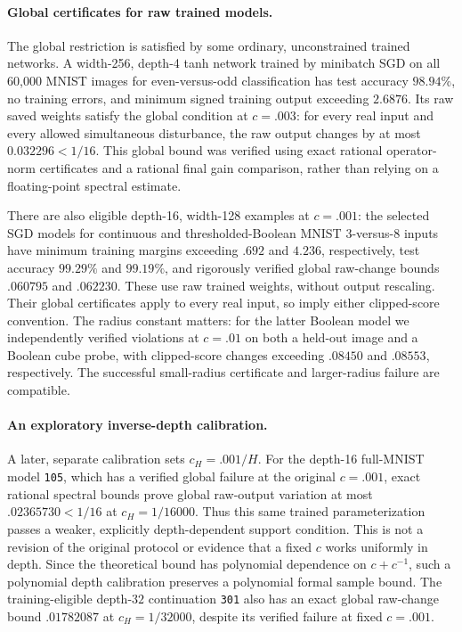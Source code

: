 \paragraph{Global certificates for raw trained models.}
The global restriction is satisfied by some ordinary, unconstrained trained networks.  A width-256, depth-4 tanh network trained by minibatch SGD on all 60,000 MNIST images for even-versus-odd classification has test accuracy $98.94\%$, no training errors, and minimum signed training output exceeding $2.6876$.  Its raw saved weights satisfy the global condition at $c=.003$: for every real input and every allowed simultaneous disturbance, the raw output changes by at most $0.032296<1/16$.  This global bound was verified using exact rational operator-norm certificates and a rational final gain comparison, rather than relying on a floating-point spectral estimate.

There are also eligible depth-16, width-128 examples at $c=.001$: the selected SGD models for continuous and thresholded-Boolean MNIST 3-versus-8 inputs have minimum training margins exceeding $.692$ and $4.236$, respectively, test accuracy $99.29\%$ and $99.19\%$, and rigorously verified global raw-change bounds $.060795$ and $.062230$.  These use raw trained weights, without output rescaling.  Their global certificates apply to every real input, so imply either clipped-score convention.  The radius constant matters: for the latter Boolean model we independently verified violations at $c=.01$ on both a held-out image and a Boolean cube probe, with clipped-score changes exceeding $.08450$ and $.08553$, respectively.  The successful small-radius certificate and larger-radius failure are compatible.

\paragraph{An exploratory inverse-depth calibration.}
A later, separate calibration sets $c_H=.001/H$.  For the depth-16 full-MNIST model \texttt{105}, which has a verified global failure at the original $c=.001$, exact rational spectral bounds prove global raw-output variation at most $.02365730<1/16$ at $c_H=1/16000$.  Thus this same trained parameterization passes a weaker, explicitly depth-dependent support condition.  This is not a revision of the original protocol or evidence that a fixed $c$ works uniformly in depth.  Since the theoretical bound has polynomial dependence on $c+c^{-1}$, such a polynomial depth calibration preserves a polynomial formal sample bound.  The training-eligible depth-$32$ continuation \texttt{301} also has an exact global raw-change bound $.01782087$ at $c_H=1/32000$, despite its verified failure at fixed $c=.001$.

